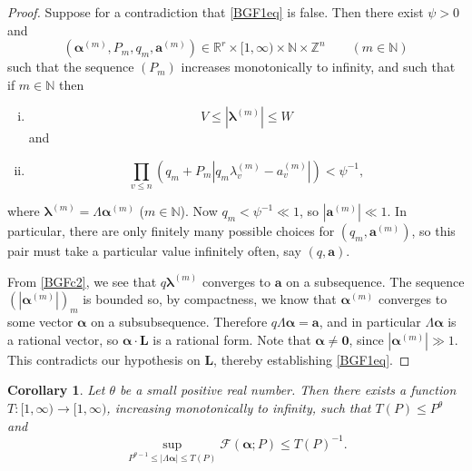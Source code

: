 \documentclass[12pt,reqno]{amsart}
\newtheorem{cor}[thm]{Corollary}
\theoremstyle{definition}
\theoremstyle{remark}
\numberwithin{equation}{section}
\begin{document}
\begin{proof}
Suppose for a contradiction that \eqref{BGF1eq} is false. Then there exist $\psi > 0$ and
\[
({\boldsymbol{{\alpha}}}^{(m)}, P_m, q_m, {\mathbf a}^{(m)}) \in {\mathbb R}^r \times [1,\infty) \times {\mathbb N} \times {\mathbb Z}^n \qquad (m \in {\mathbb N})
\]
such that the sequence $(P_m)$ increases monotonically to infinity, and such that if $m \in {\mathbb N}$ then
\begin{enumerate}[(i)]
\item
\[
V {\leqslant} |{{\boldsymbol {{\lambda}}}}^{(m)}| {\leqslant} W
\]
and 
\item
\begin{equation} \label{BGFc2}
\prod_{v {\leqslant} n} (q_m + P_m|q_m {{\lambda}}_v^{(m)} - a^{(m)}_v|) < \psi^{-1},
\end{equation}
\end{enumerate}
where ${{\boldsymbol {{\lambda}}}}^{(m)} = {{\Lambda}} {\boldsymbol{{\alpha}}}^{(m)}$ ($m \in {\mathbb N}$). Now $q_m < \psi^{-1} \ll 1$, so $|{\mathbf a}^{(m)}| \ll 1$. In particular, there are only finitely many possible choices for $(q_m, {\mathbf a}^{(m)})$, so this pair must take a particular value infinitely often, say $(q, {\mathbf a})$. 

From \eqref{BGFc2}, we see that $q {{\boldsymbol {{\lambda}}}}^{(m)}$ converges to ${\mathbf a}$ on a subsequence. The sequence $(|{\boldsymbol{{\alpha}}}^{(m)}|)_m$ is bounded so, by compactness, we know that ${\boldsymbol{{\alpha}}}^{(m)}$ converges to some vector ${\boldsymbol{{\alpha}}}$ on a subsubsequence. Therefore $q {{\Lambda}} {\boldsymbol{{\alpha}}} = {\mathbf a}$, and in particular ${{\Lambda}} {\boldsymbol{{\alpha}}}$ is a rational vector, so ${\boldsymbol{{\alpha}}} \cdot {\mathbf L}$ is a rational form. Note that ${\boldsymbol{{\alpha}}} \ne {\mathbf 0}$, since $|{\boldsymbol{{\alpha}}}^{(m)}| \gg 1$. This contradicts our hypothesis on ${\mathbf L}$, thereby establishing \eqref{BGF1eq}.
\end{proof}

\begin{cor} \label{BGF2}
Let ${{\theta}}$ be a small positive real number. Then there exists a function $T: [1,\infty) \to [1,\infty)$, increasing monotonically to infinity, such that $T(P) {\leqslant} P^{{\theta}}$ and
\begin{equation} \label{FreemanBound}
\sup_{P^{{{\theta}} - 1} {\leqslant} |{{\Lambda}} {\boldsymbol{{\alpha}}}| {\leqslant} T(P)} {\mathcal F}({\boldsymbol{{\alpha}}}; P) {\leqslant} T(P)^{-1}.
\end{equation}
\end{cor}
\end{document}
